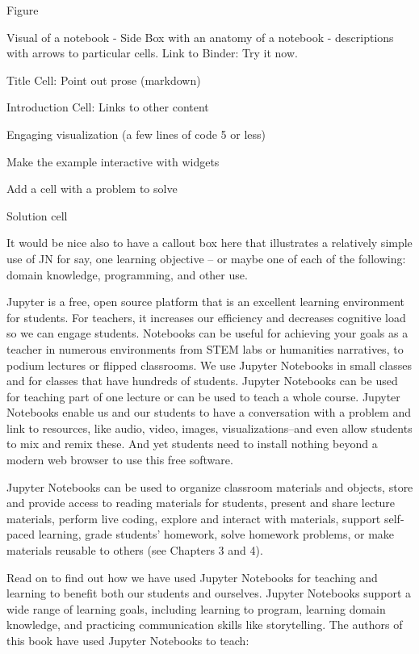 \documentclass[]{book}
\begin{document}
Figure

Visual of a notebook - Side Box with an anatomy of a notebook -
descriptions with arrows to particular cells. Link to Binder: Try it
now.

Title Cell: Point out prose (markdown)

Introduction Cell: Links to other content

Engaging visualization (a few lines of code 5 or less)

Make the example interactive with widgets

Add a cell with a problem to solve

Solution cell

It would be nice also to have a callout box here that illustrates a
relatively simple use of JN for say, one learning objective -- or maybe
one of each of the following: domain knowledge, programming, and other
use.

Jupyter is a free, open source platform that is an excellent learning
environment for students. For teachers, it increases our efficiency and
decreases cognitive load so we can engage students. Notebooks can be
useful for achieving your goals as a teacher in numerous environments
from STEM labs or humanities narratives, to podium lectures or flipped
classrooms. We use Jupyter Notebooks in small classes and for classes
that have hundreds of students. Jupyter Notebooks can be used for
teaching part of one lecture or can be used to teach a whole course.
Jupyter Notebooks enable us and our students to have a conversation with
a problem and link to resources, like audio, video, images,
visualizations--and even allow students to mix and remix these. And yet
students need to install nothing beyond a modern web browser to use this
free software.

Jupyter Notebooks can be used to organize classroom materials and
objects, store and provide access to reading materials for students,
present and share lecture materials, perform live coding, explore and
interact with materials, support self-paced learning, grade students'
homework, solve homework problems, or make materials reusable to others
(see Chapters 3 and 4).

Read on to find out how we have used Jupyter Notebooks for teaching and
learning to benefit both our students and ourselves. Jupyter Notebooks
support a wide range of learning goals, including learning to program,
learning domain knowledge, and practicing communication skills like
storytelling. The authors of this book have used Jupyter Notebooks to
teach:
\end{document}

